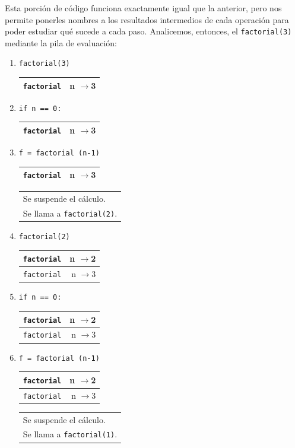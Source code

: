 Esta porción de código funciona exactamente igual que la anterior, pero nos
permite ponerles nombres a los resultados intermedios de cada operación
para poder estudiar qué sucede a cada paso.
Analicemos, entonces, el \lstinline|factorial(3)|  mediante la pila de
evaluación:

\begin{enumerate}

\item  \verb|factorial(3)              | 
	\begin{tabular}{r|r|}
	\hline
	\verb|factorial|&n $\rightarrow$3\\
	\hline
	\end{tabular}

\item  \verb|if n == 0:                | 
	\begin{tabular}{r|r|}
	\hline
	\verb|factorial|&n $\rightarrow$3\\
	\hline
	\end{tabular}

\item  \verb|f = factorial (n-1)       |
	\begin{tabular}{r|r|}
	\hline
	\verb|factorial|&n $\rightarrow$3\\
	\hline
	\end{tabular}
	\begin{tabular}{l}
	Se suspende el cálculo. \\
	Se llama a \verb|factorial(2)|.
	\end{tabular}

\item  \verb|factorial(2)              | 
	\begin{tabular}{r|r|}
	\hline
	\verb|factorial|&n $\rightarrow$2\\
	\hline
	\hline
	\verb|factorial|&n $\rightarrow$3\\
	\hline
	\end{tabular}

\item  \verb|if n == 0:                | 
	\begin{tabular}{r|r|}
	\hline
	\verb|factorial|&n $\rightarrow$2\\
	\hline
	\hline
	\verb|factorial|&n $\rightarrow$3\\
	\hline
	\end{tabular}

\item  \verb|f = factorial (n-1)       |
	\begin{tabular}{r|r|}
	\hline
	\verb|factorial|&n $\rightarrow$2\\
	\hline
	\hline
	\verb|factorial|&n $\rightarrow$3\\
	\hline
	\end{tabular}
	\begin{tabular}{l}
	Se suspende el cálculo. \\
	Se llama a \verb|factorial(1)|.
	\end{tabular}


\end{enumerate}
